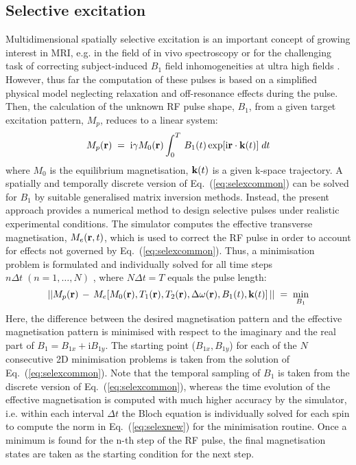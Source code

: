 \documentclass{nic-series}
\begin{document}
\subsection{Selective excitation}
Multidimensional spatially selective excitation \cite{pauly} is an important concept of growing interest in MRI, e.g. in the field
of in vivo spectroscopy or for the challenging task of correcting subject-induced $B_1$ field inhomogeneities at ultra high fields \cite{ibrahim}.
However, thus far the computation of these pulses is based on a simplified physical model neglecting relaxation and
off-resonance effects during the pulse. Then, the calculation of the unknown RF pulse shape, $B_1$, from a
given target excitation pattern, $M_p$, reduces to a linear system:
\begin{equation}\label{eq:selexcommon}
 M_{p}({\bf r})\;=\;\mbox{i}\gamma M_0({\bf r})\int_{0}^{T}\,B_1(t)\exp[\mbox{i}{\bf r}\cdot{\bf k}(t)]\;dt
\end{equation}
where $M_0$ is the equilibrium magnetisation, ${\bf k}(t)$ is a given k-space trajectory.
A spatially and temporally discrete version of Eq.~(\ref{eq:selexcommon}) can be solved for $B_1$ by suitable generalised matrix inversion
methods.
Instead, the present approach provides a numerical method to design selective pulses under realistic experimental
conditions. The simulator computes the effective transverse magnetisation, $M_e({\bf r},t)$, which is used to correct the RF
pulse in order to account for effects not governed by Eq.~(\ref{eq:selexcommon}). Thus, a minimisation problem is formulated and
individually solved for all time steps $n\Delta t\;(n=1,…,N)$ , where $N\Delta t=T$ equals the pulse length:
\begin{equation}\label{eq:selexnew}
 || M_{p}({\bf r})\,-\, M_e[M_0({\bf r}),T_1({\bf r}),T_2({\bf r}),\Delta\omega({\bf r}),B_1(t),{\bf k}(t)]\,||\;=\;\min_{B_1}
\end{equation}
Here, the difference between the desired magnetisation pattern and the effective magnetisation pattern is minimised
with respect to the imaginary and the real part of $B_1= B_{1x} + \mbox{i}B_{1y}$. The starting point ($B_{1x},B_{1y}$) for each of
the $N$ consecutive 2D minimisation problems is taken from the solution of Eq.~(\ref{eq:selexcommon}). Note that the temporal sampling
of $B_1$ is taken from the discrete version of Eq.~(\ref{eq:selexcommon}), whereas the time evolution of the effective magnetisation
is computed with much higher accuracy by the simulator, i.e. within each interval $\Delta t$ the Bloch equation is individually solved
for each spin to compute the norm in Eq.~(\ref{eq:selexnew}) for the minimisation routine. Once a minimum is found for the n-th step of
the RF pulse, the final magnetisation states are taken as the starting condition for the next step.
\end{document}
